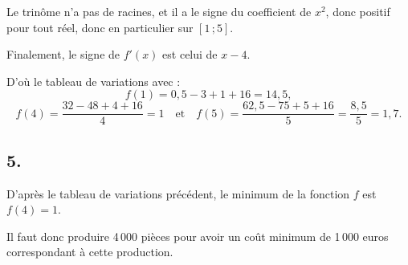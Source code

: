 Le trinôme n'a pas de racines, et il a le signe du coefficient de \( x^2 \), donc positif pour tout réel, donc en particulier sur \( [1 \, ; 5] \).

Finalement, le signe de \( f'(x) \) est celui de \( x - 4 \).

D'où le tableau de variations avec :
\[
f(1) = 0{,}5 - 3 + 1 + 16 = 14{,}5,
\] 
\[
f(4) = \dfrac{32 - 48 + 4 + 16}{4} = 1 \quad \text{et} \quad f(5) = \dfrac{62{,}5 - 75 + 5 + 16}{5} = \dfrac{8{,}5}{5} = 1{,}7.
\]

\begin{center}
\end{center}

\subsection*{5.}

D'après le tableau de variations précédent, le minimum de la fonction \( f \) est \( f(4) = 1 \).

Il faut donc produire 4\,000 pièces pour avoir un coût minimum de 1\,000 euros correspondant à cette production.
